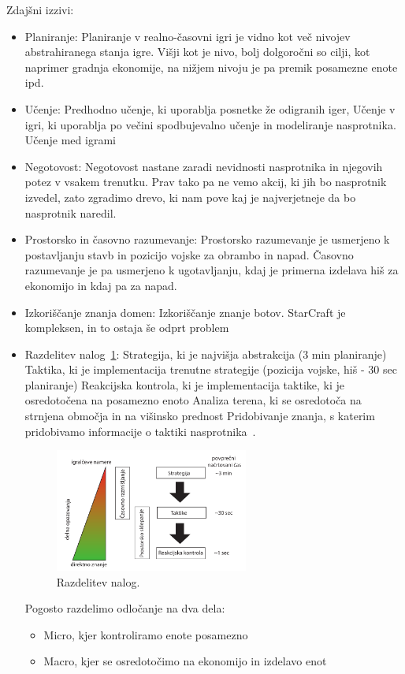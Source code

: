 \documentclass[a4paper, 12pt]{book}
\begin{document}
Zdajšni izzivi:
\begin{itemize}
	\item Planiranje:
	Planiranje v realno-časovni igri je vidno kot več nivojev abstrahiranega stanja igre. Višji kot je nivo, bolj dolgoročni so cilji, kot naprimer gradnja ekonomije, na nižjem nivoju je pa premik posamezne enote ipd.
	\item Učenje:
	Predhodno učenje, ki uporablja posnetke že odigranih iger,
	Učenje v igri, ki uporablja po večini spodbujevalno učenje in modeliranje nasprotnika.
	Učenje med igrami
	\item Negotovost:
	Negotovost nastane zaradi nevidnosti nasprotnika in njegovih potez v vsakem trenutku. Prav tako pa ne vemo akcij, ki jih bo nasprotnik izvedel, zato zgradimo drevo, ki nam pove kaj je najverjetneje da bo nasprotnik naredil.
	\item Prostorsko in časovno razumevanje:
	Prostorsko razumevanje je usmerjeno k postavljanju stavb in pozicijo vojske za obrambo in napad.
	Časovno razumevanje je pa usmerjeno k ugotavljanju, kdaj je primerna izdelava hiš za ekonomijo in kdaj pa za napad.
	\item Izkoriščanje znanja domen:
	Izkoriščanje znanje botov. StarCraft je kompleksen, in to ostaja še odprt problem
	\item Razdelitev nalog~\ref{pic1}:
	Strategija, ki je najvišja abstrakcija (3 min planiranje)
	Taktika, ki je implementacija trenutne strategije (pozicija vojske, hiš - 30 sec planiranje)
	Reakcijska kontrola, ki je implementacija taktike, ki je osredotočena na posamezno enoto
	Analiza terena, ki se osredotoča na strnjena območja in na višinsko prednost
	Pridobivanje znanja, s katerim pridobivamo informacije o taktiki nasprotnika~\cite{survey_real_time_strategy_ai_research_starcraft}.
	
	\begin{figure}[h]
		\begin{center}
			\includegraphics[width=0.6\textwidth]{RazdelitevNalog.pdf}
		\end{center}
		\caption{Razdelitev nalog.}
		\label{pic1}
	\end{figure}
	
	Pogosto razdelimo odločanje na dva dela:
	\begin{itemize}
		\item Micro, kjer kontroliramo enote posamezno
		\item Macro, kjer se osredotočimo na ekonomijo in izdelavo enot
	\end{itemize}
\end{itemize}
\end{document}

